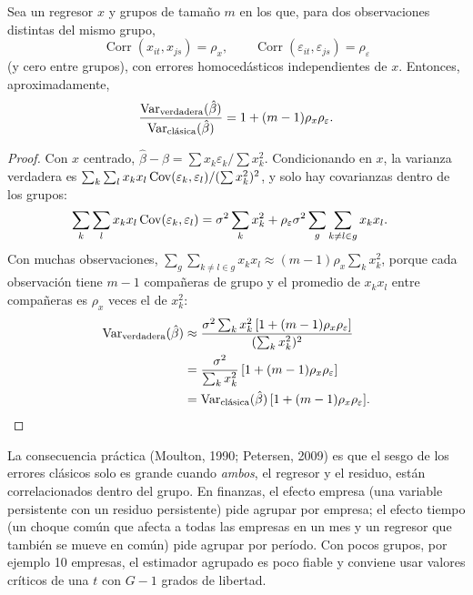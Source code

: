 \begin{proposicion}\label{prop:moulton}
Sea un regresor $x$ y grupos de tamaño $m$ en los que, para dos observaciones distintas del mismo grupo,
\[
  \operatorname{Corr}(x_{it},x_{js})=\rho_x,\qquad \operatorname{Corr}(\varepsilon_{it},\varepsilon_{js})=\rho_\varepsilon
\]
(y cero entre grupos), con errores homocedásticos independientes de $x$. Entonces,
aproximadamente,
\[
  \frac{\operatorname{Var}_{\text{verdadera}}(\hat\beta)}{\operatorname{Var}_{\text{clásica}}(\hat\beta)}=1+(m-1)\rho_x\rho_\varepsilon .
\]
\end{proposicion}

\begin{proof}
Con $x$ centrado, $\hat\beta-\beta=\sum x_k\varepsilon_k/\sum x_k^2$. Condicionando en $x$, la varianza verdadera es
$\sum_k\sum_lx_kx_l\operatorname{Cov}(\varepsilon_k,\varepsilon_l)/(\sum x_k^2)^2$, y solo hay covarianzas dentro de los grupos:
\begin{align*}
  \sum_k\sum_lx_kx_l\operatorname{Cov}(\varepsilon_k,\varepsilon_l) &= \sigma^2\sum_kx_k^2+\rho_\varepsilon\sigma^2\sum_g\sum_{k\neq l\in g}x_kx_l .
\end{align*}
Con muchas observaciones, $\sum_g\sum_{k\neq l\in g}x_kx_l\approx(m-1)\rho_x\sum_kx_k^2$, porque cada observación tiene $m-1$
compañeras de grupo y el promedio de $x_kx_l$ entre compañeras es $\rho_x$ veces el de $x_k^2$:
\begin{align*}
  \operatorname{Var}_{\text{verdadera}}(\hat\beta) &\approx \frac{\sigma^2\sum_kx_k^2\,[1+(m-1)\rho_x\rho_\varepsilon]}{(\sum_kx_k^2)^2}\\
                                    &= \frac{\sigma^2}{\sum_kx_k^2}\,[1+(m-1)\rho_x\rho_\varepsilon]\\
                                    &= \operatorname{Var}_{\text{clásica}}(\hat\beta)\,[1+(m-1)\rho_x\rho_\varepsilon].
\end{align*}
\end{proof}

La consecuencia práctica (Moulton, 1990; Petersen, 2009) es que el sesgo de los errores clásicos solo es grande cuando
\emph{ambos}, el regresor y el residuo, están correlacionados dentro del grupo. En finanzas, el efecto empresa (una variable
persistente con un residuo persistente) pide agrupar por empresa; el efecto tiempo (un choque común que afecta a todas las
empresas en un mes y un regresor que también se mueve en común) pide agrupar por período. Con pocos grupos, por ejemplo 10
empresas, el estimador agrupado es poco fiable y conviene usar valores críticos de una $t$ con $G-1$ grados de libertad.

